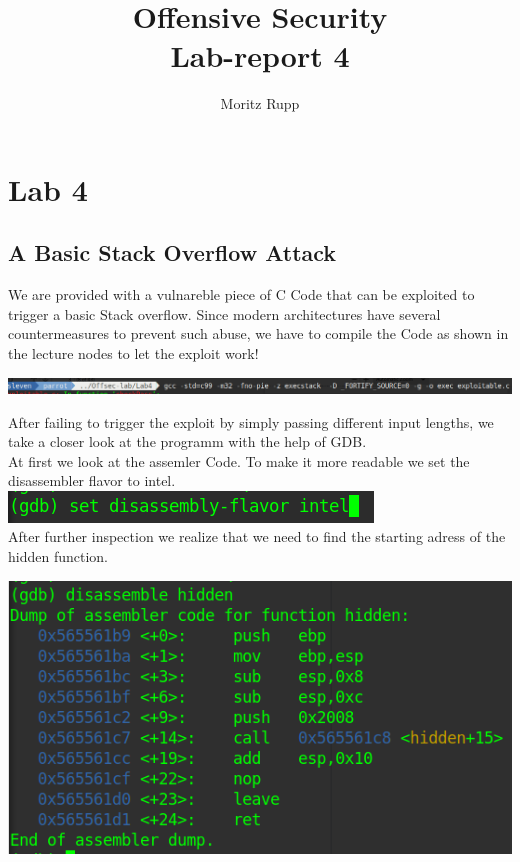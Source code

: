 \documentclass[a4paper,10pt]{article}
\title{Offensive Security\\Lab-report 4}
\author{Moritz Rupp}
\begin{document}
\maketitle
\tableofcontents

\newpage
\section{Lab 4}
\subsection{A Basic Stack Overflow Attack}
We are provided with a vulnareble piece of C Code that can be exploited to trigger a basic Stack overflow. Since modern architectures have several countermeasures to prevent such abuse, we have to compile the Code as shown in the lecture nodes to let the exploit work!
\begin{center}
 \includegraphics[scale=0.3]{gcc.png}
\end{center} 
After failing to trigger the exploit by simply passing different input lengths, we take a closer look at the programm with the help of GDB.\\
At first we look at the assemler Code. To make it more readable we set the disassembler flavor to intel. \includegraphics[scale=0.4]{intelfalvor.png}\\
After further inspection we realize that we need to find the starting adress of the hidden function.
\begin{center}
 \includegraphics[scale=0.5]{hidden.png}
\end{center}
\end{document}
